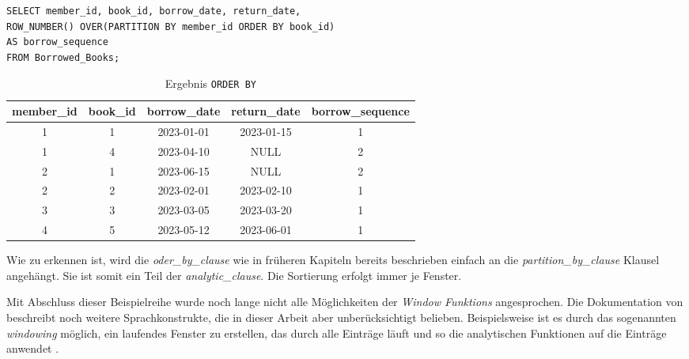 \begin{lstlisting}[label={list:window-function-order-by}]
SELECT member_id, book_id, borrow_date, return_date,
ROW_NUMBER() OVER(PARTITION BY member_id ORDER BY book_id)
AS borrow_sequence
FROM Borrowed_Books;
\end{lstlisting}
\begin{table}[h]
	\centering
	\begin{tabular}{|c|c|c|c|c|}
		\hline
		\textbf{member\_id} & \textbf{book\_id} & \textbf{borrow\_date} & \textbf{return\_date} & \textbf{borrow\_sequence} \\
		\hline
		1                   & 1                 & 2023-01-01            & 2023-01-15            & 1                         \\
		\hline
		1                   & 4                 & 2023-04-10            & NULL                  & 2                         \\
		\hline
		2                   & 1                 & 2023-06-15            & NULL                  & 2                         \\
		\hline
		2                   & 2                 & 2023-02-01            & 2023-02-10            & 1                         \\
		\hline
		3                   & 3                 & 2023-03-05            & 2023-03-20            & 1                         \\
		\hline
		4                   & 5                 & 2023-05-12            & 2023-06-01            & 1                         \\
		\hline
	\end{tabular}
	\caption{Ergebnis \texttt{ORDER BY}}
	\label{tab:ergebnis_oder_by}
\end{table}

Wie zu erkennen ist, wird die \textit{oder\_by\_clause} wie in früheren Kapiteln
bereits beschrieben einfach an die \textit{partition\_by\_clause} Klausel
angehängt. Sie ist somit ein Teil der \textit{analytic\_clause}. Die Sortierung erfolgt
immer je Fenster.

Mit Abschluss dieser Beispielreihe wurde noch lange nicht alle Möglichkeiten der
\textit{Window Funktions} angesprochen. Die Dokumentation von \citet[K. 7]{oracle}
beschreibt noch weitere Sprachkonstrukte, die in dieser Arbeit aber unberücksichtigt
belieben. Beispielsweise ist es durch das sogenannten \textit{windowing} möglich,
ein laufendes Fenster zu erstellen, das durch alle Einträge läuft und so die analytischen
Funktionen auf die Einträge anwendet \citep[vgl.][]{oracle}.

